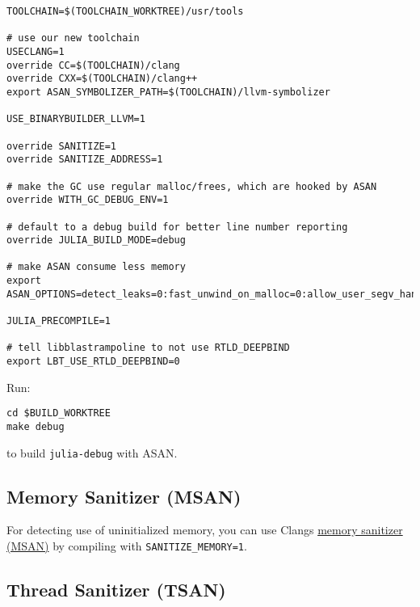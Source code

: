 \begin{lstlisting}
TOOLCHAIN=$(TOOLCHAIN_WORKTREE)/usr/tools

# use our new toolchain
USECLANG=1
override CC=$(TOOLCHAIN)/clang
override CXX=$(TOOLCHAIN)/clang++
export ASAN_SYMBOLIZER_PATH=$(TOOLCHAIN)/llvm-symbolizer

USE_BINARYBUILDER_LLVM=1

override SANITIZE=1
override SANITIZE_ADDRESS=1

# make the GC use regular malloc/frees, which are hooked by ASAN
override WITH_GC_DEBUG_ENV=1

# default to a debug build for better line number reporting
override JULIA_BUILD_MODE=debug

# make ASAN consume less memory
export ASAN_OPTIONS=detect_leaks=0:fast_unwind_on_malloc=0:allow_user_segv_handler=1:malloc_context_size=2

JULIA_PRECOMPILE=1

# tell libblastrampoline to not use RTLD_DEEPBIND
export LBT_USE_RTLD_DEEPBIND=0
\end{lstlisting}



Run:




\begin{lstlisting}
cd $BUILD_WORKTREE
make debug
\end{lstlisting}



to build \texttt{julia-debug} with ASAN.



\hypertarget{11752764117060042950}{}


\subsection{Memory Sanitizer (MSAN)}



For detecting use of uninitialized memory, you can use Clang{\textquotesingle}s \href{https://clang.llvm.org/docs/MemorySanitizer.html}{memory sanitizer (MSAN)} by compiling with \texttt{SANITIZE\_MEMORY=1}.



\hypertarget{14311970646292028418}{}


\subsection{Thread Sanitizer (TSAN)}



